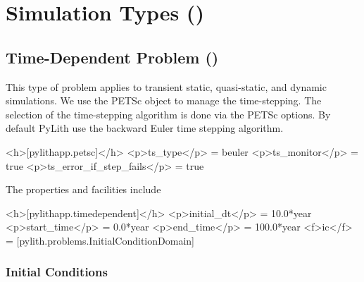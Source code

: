 \section{Simulation Types (\protect{})}

\subsection{Time-Dependent Problem (\protect{})}

This type of problem applies to transient static, quasi-static, and
dynamic simulations. We use the PETSc  object to manage the
time-stepping. The selection of the time-stepping algorithm is done
via the PETSc options. By default PyLith use the backward Euler time
stepping algorithm.

\begin{cfg}
<h>[pylithapp.petsc]</h>
<p>ts_type</p> = beuler
<p>ts_monitor</p> = true
<p>ts_error_if_step_fails</p> = true
\end{cfg}

The  properties and facilities include
\begin{inventory}
\end{inventory}

\begin{cfg}
<h>[pylithapp.timedependent]</h>
<p>initial_dt</p> = 10.0*year
<p>start_time</p> = 0.0*year
<p>end_time</p> = 100.0*year
<f>ic</f> = [pylith.problems.InitialConditionDomain]
\end{cfg}


\subsubsection{Initial Conditions}

